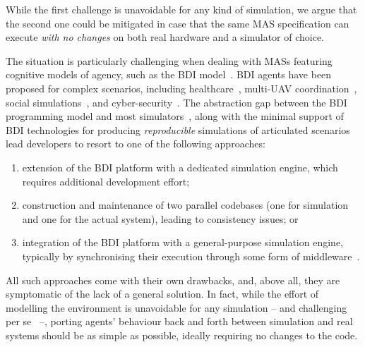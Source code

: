 While the first challenge is unavoidable for any kind of simulation,
we argue that the second one could be mitigated in case that the same \ac{MAS} specification can execute \emph{with no changes}
on both real hardware and a simulator of choice.

The situation is particularly challenging when dealing with \acp{MAS} featuring cognitive models of agency,
such as the \ac{BDI} model~\cite{RaoG95}.
%
\ac{BDI} agents have been proposed for complex scenarios, including
healthcare~\cite{CroattiMRGAA19},
multi-\acs{UAV} coordination~\cite{SilvestreLDBHB23},
social simulations~\cite{AdamGaudou2016},
and
cyber-security~\cite{NunesSF17}.
%
%
%
The abstraction gap between the \ac{BDI} programming model and most simulators~\cite{singh_integrating_2016},
along with the minimal support of \ac{BDI} technologies
for producing \emph{reproducible} simulations of articulated scenarios
lead developers to resort to one of the following approaches:
%
\begin{enumerate}
    \item extension of the \ac{BDI} platform with a dedicated simulation engine,
    which requires additional development effort;
    \item construction and maintenance of two parallel codebases
    (one for simulation and one for the actual system),
    leading to consistency issues;
    or
    \item integration of the \ac{BDI} platform with a general-purpose simulation engine,
    typically by synchronising their execution through some form of middleware~\cite{singh_integrating_2016}.
\end{enumerate}

All such approaches come with their own drawbacks,
and,
above all,
they are symptomatic of the lack of a general solution.
%
In fact,
while the effort of modelling the environment is unavoidable for any simulation
-- and challenging per se~\cite{simchallenges} --,
porting agents' behaviour back and forth between simulation and real systems
should be as simple as possible,
ideally requiring no changes to the code.


